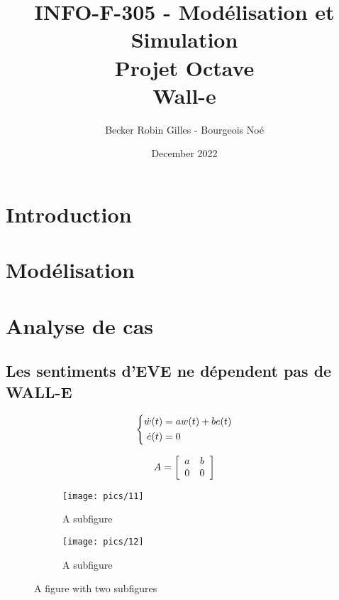 \documentclass[utf8]{article}
\title{INFO-F-305 - Modélisation et Simulation
\\Projet Octave
\\Wall-e}
\author{Becker Robin Gilles - Bourgeois Noé}
\date{December 2022}
\begin{document}
\maketitle
\tableofcontents

\newpage


\section{Introduction}
\newpage

\section{Modélisation}
\newpage

\section{Analyse de cas}
\newpage

\subsection{Les sentiments d’EVE ne dépendent pas de WALL-E}

\begin{equation}
\centering
\left\{\begin{split}
\dot{w}(t) &= aw(t) + be(t)\\
\dot{e}(t) &= 0 \\
\end{split}\right.
 \end{equation}

\begin{equation}
\centering
A = \left[
\begin{array}{cc}
a & b\\
0 & 0
\end{array}
\right]
 \end{equation}

\begin{figure}
\centering
\begin{subfigure}{.5\textwidth}
  \centering
  \texttt{[image: pics/11]}
  \caption{A subfigure}
  \label{fig:sub1}
\end{subfigure}%
\begin{subfigure}{.5\textwidth}
  \centering
  \texttt{[image: pics/12]}
  \caption{A subfigure}
  \label{fig:sub2}
\end{subfigure}
\caption{A figure with two subfigures}
\label{fig:test}
\end{figure}
\end{document}
